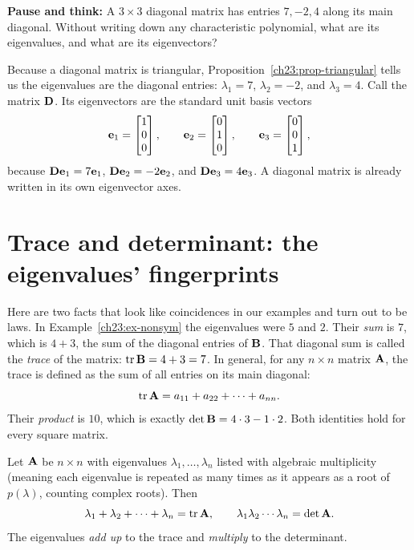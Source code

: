 \begin{recoverybox}
\textbf{Pause and think:} A $3\times 3$ diagonal matrix has entries $7, -2, 4$ along its main diagonal. Without writing down any characteristic polynomial, what are its eigenvalues, and what are its eigenvectors?
\vspace{0.3em}

Because a diagonal matrix is triangular, Proposition~\ref{ch23:prop-triangular} tells us the eigenvalues are the diagonal entries: $\lambda_1=7$, $\lambda_2=-2$, and $\lambda_3=4$. Call the matrix $\mathbf{D}$. Its eigenvectors are the standard unit basis vectors
\[
  \mathbf{e}_1 = \begin{bmatrix}1\\0\\0\end{bmatrix},\qquad \mathbf{e}_2 = \begin{bmatrix}0\\1\\0\end{bmatrix},\qquad \mathbf{e}_3 = \begin{bmatrix}0\\0\\1\end{bmatrix},
\]
because $\mathbf{D}\mathbf{e}_1 = 7\mathbf{e}_1$, $\mathbf{D}\mathbf{e}_2 = -2\mathbf{e}_2$, and $\mathbf{D}\mathbf{e}_3 = 4\mathbf{e}_3$. A diagonal matrix is already written in its own eigenvector axes.
\end{recoverybox}

\section{Trace and determinant: the eigenvalues' fingerprints}
\label{ch23:trace-det}

Here are two facts that look like coincidences in our examples and turn out to be
laws. In Example~\ref{ch23:ex-nonsym} the eigenvalues were $5$ and $2$. Their
\emph{sum} is $7$, which is $4+3$, the sum of the diagonal entries of $\mathbf{B}$.
That diagonal sum is called the \emph{trace} of the matrix:
$\operatorname{tr}\mathbf{B} = 4+3 = 7$. In general, for any $n\times n$ matrix $\mathbf{A}$, the trace is
defined as the sum of all entries on its main diagonal:
\[
  \operatorname{tr}\mathbf{A} = a_{11} + a_{22} + \dots + a_{nn}.
\]
Their \emph{product} is $10$, which is exactly $\det\mathbf{B}=4\cdot 3-1\cdot 2$.
Both identities hold for every square matrix.

\begin{theorem}
\label{ch23:thm-trace-det}
Let $\mathbf{A}$ be $n\times n$ with eigenvalues $\lambda_1,\dots,\lambda_n$ listed
with algebraic multiplicity (meaning each eigenvalue is repeated as many times
as it appears as a root of $p(\lambda)$, counting complex roots). Then
\[
  \lambda_1+\lambda_2+\cdots+\lambda_n=\operatorname{tr}\mathbf{A},
  \qquad
  \lambda_1\lambda_2\cdots\lambda_n=\det\mathbf{A}.
\]
The eigenvalues \emph{add up} to the trace and \emph{multiply} to the determinant.
\end{theorem}

